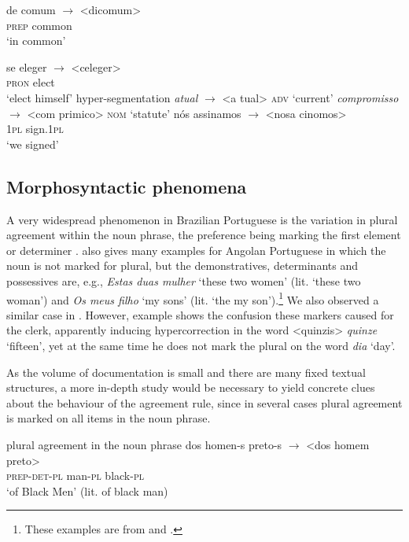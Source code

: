 \documentclass[output=paper,colorlinks,citecolor=brown]{langscibook}
\begin{document}
\ex\label{ex:6:19d} \gll de comum $\rightarrow$ <dicomum> \\
         \textsc{prep} common \\
    \glt ‘in common’

\ex \gll se eleger $\rightarrow$ <celeger> \\
        \textsc{pron} elect \\
    \glt ‘elect himself’
\z
\ex\label{ex:6:20}hyper-segmentation
\ea\label{ex:6:20a} \emph{atual}  $\rightarrow$ <a tual> \textsc{adv} ‘current’
\ex\label{ex:6:20b} \emph{compromisso} $\rightarrow$ <com primico> \textsc{nom} ‘statute’
\ex\label{ex:6:20c} \gll nós assinamos $\rightarrow$ <nosa cinomos> \\
        \textsc{1pl} sign.\textsc{1pl} \\
\glt   ‘we signed’
    \z
\z

\subsection{Morphosyntactic phenomena}

A very widespread phenomenon in Brazilian Portuguese is the variation in plural agreement within the noun phrase, the preference being marking the first element or determiner \citep{Lucchesi_Baxter_Ribeiro_2009}. \citet{Inverno_2005} also gives many examples for Angolan Portuguese in which the noun is not marked for plural, but the demonstratives, determinants and possessives are, e.g., \emph{Estas duas mulher} ‘these two women’ (lit. ‘these two woman’) and \emph{Os meus filho} ‘my sons’ (lit. ‘the my son’).\footnote{These examples are from \citet{Inverno_2005} and \citet{Petter_2009}.} We also observed a similar case in . However, example  shows the confusion these markers caused for the clerk, apparently inducing hypercorrection in the word <quinzis> \emph{quinze} ‘fifteen’, yet at the same time he does not mark the plural on the word \emph{dia} ‘day’.

As the volume of documentation is small and there are many fixed textual structures, a more in-depth study would be necessary to yield concrete clues about the behaviour of the agreement rule, since in several cases plural agreement is marked on all items in the noun phrase.

\ea\label{ex:6:21}plural agreement in the noun phrase
\ea \label{ex:6:21a}
\gll dos homen-s preto-s $\rightarrow$ <dos homem preto> \\
    \textsc{prep-det-pl}  man-\textsc{pl}  black-\textsc{pl}   \\
\glt ‘of Black Men’ (lit. of black man) 
\end{document}
